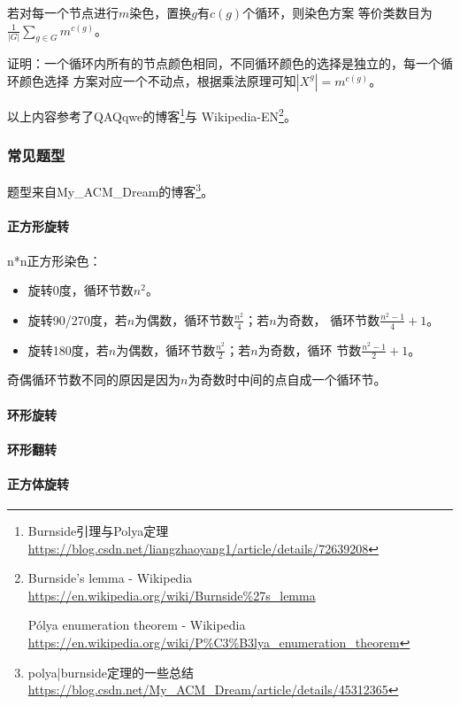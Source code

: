 \begin{theorem}
    若对每一个节点进行$m$染色，置换$g$有$c(g)$个循环，则染色方案
    等价类数目为$\displaystyle \frac{1}{|G|}\sum_{g\in G}m^{c(g)}$。
\end{theorem}

证明：一个循环内所有的节点颜色相同，不同循环颜色的选择是独立的，每一个循环颜色选择
方案对应一个不动点，根据乘法原理可知$|X^g|=m^{c(g)}$。

以上内容参考了QAQqwe的博客\footnote{Burnside引理与Polya定理
\url{https://blog.csdn.net/liangzhaoyang1/article/details/72639208}}与
Wikipedia-EN\footnote{
    Burnside's lemma - Wikipedia
    \url{https://en.wikipedia.org/wiki/Burnside\%27s\_lemma}

    Pólya enumeration theorem - Wikipedia
    \url{https://en.wikipedia.org/wiki/P\%C3\%B3lya\_enumeration\_theorem}
}。

\subsubsection{常见题型}
题型来自My\_ACM\_Dream的博客\footnote{polya|burnside定理的一些总结\\
\url{https://blog.csdn.net/My\_ACM\_Dream/article/details/45312365}}。

\paragraph{正方形旋转}
n*n正方形染色：
\begin{itemize}
    \item 旋转0度，循环节数$n^2$。
    \item 旋转90/270度，若$n$为偶数，循环节数$\frac{n^2}{4}$；若$n$为奇数，
    循环节数$\frac{n^2-1}{4}+1$。
    \item 旋转180度，若$n$为偶数，循环节数$\frac{n^2}{2}$；若$n$为奇数，循环
    节数$\frac{n^2-1}{2}+1$。
\end{itemize}
奇偶循环节数不同的原因是因为$n$为奇数时中间的点自成一个循环节。
\paragraph{环形旋转}
\paragraph{环形翻转}
\paragraph{正方体旋转}

